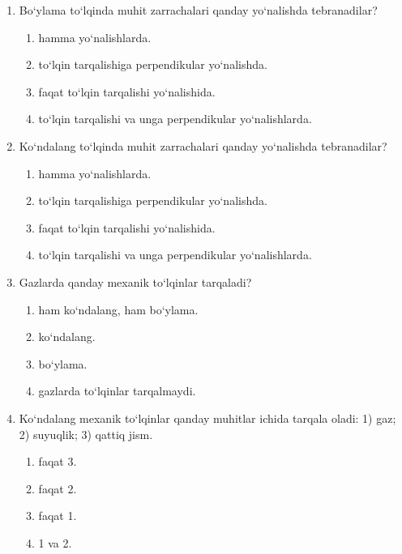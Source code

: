 \begin{enumerate}
\begin{enumerate}[label=\Alph*)]
\end{enumerate}

\item Bo‘ylama to‘lqinda muhit zarrachalari qanday yo‘nalishda tebranadilar?
\begin{enumerate}[label=\Alph*)]
\item hamma yo‘nalishlarda.
\item to‘lqin tarqalishiga perpendikular yo‘nalishda.
\item faqat to‘lqin tarqalishi yo‘nalishida.
\item to‘lqin tarqalishi va unga perpendikular yo‘nalishlarda.

\end{enumerate}

\item Ko‘ndalang to‘lqinda muhit zarrachalari qanday yo‘nalishda tebranadilar?
\begin{enumerate}[label=\Alph*)]
\item hamma yo‘nalishlarda.
\item to‘lqin tarqalishiga perpendikular yo‘nalishda.
\item faqat to‘lqin tarqalishi yo‘nalishida.
\item to‘lqin tarqalishi va unga perpendikular yo‘nalishlarda.

\end{enumerate}

\item Gazlarda qanday mexanik to‘lqinlar tarqaladi?
\begin{enumerate}[label=\Alph*)]
\item ham ko‘ndalang, ham bo‘ylama.
\item ko‘ndalang.
\item bo‘ylama.
\item gazlarda to‘lqinlar tarqalmaydi.

\end{enumerate}

\item Ko‘ndalang mexanik to‘lqinlar qanday muhitlar ichida tarqala oladi: 
1) gaz; 2) suyuqlik; 3) qattiq jism.
\begin{enumerate}[label=\Alph*)]
\item faqat 3.
\item faqat 2.
\item faqat 1.
\item 1 va 2.

\end{enumerate}


\end{enumerate}
